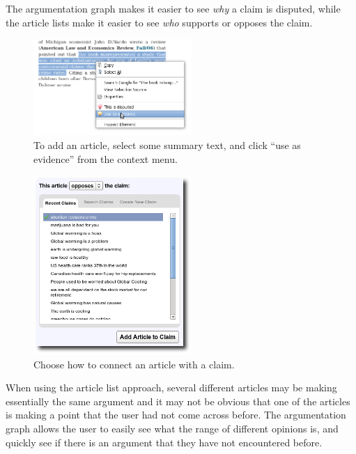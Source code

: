 \documentclass{www2010-submission}
\newcommand{\todo}[1]{}
\begin{document}
The argumentation graph makes it easier to see {\it why} a claim is disputed, while the article lists make it easier to see {\it who} supports or opposes the claim. 

\begin{figure}[tb]
	\begin{center}
	\includegraphics[width=6cm]{pictures/mark_evidence.png}
	\caption{To add an article, select some summary text, and click ``use as evidence'' from the context menu.}
	\label{add_article}
	\end{center}
\end{figure}

\begin{figure}[tb]
	\begin{center}
	\includegraphics[width=6cm]{pictures/article_choose_claim.png}
	\caption{Choose how to connect an article with a claim.}
	\label{article_choose}
	\end{center}
\end{figure}

\todo{Call them supporting pages? Naming is a mess right now.}

When using the article list approach, several different articles may be making essentially the same argument and it may not be obvious that one of the articles is making a point that the user had not come across before. The argumentation graph allows the user to easily see what the range of different opinions is, and quickly see if there is an argument that they have not encountered before. 
\end{document}

